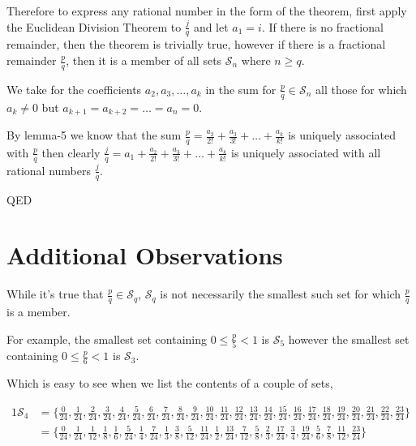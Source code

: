 \documentclass{article}
\begin{document}
Therefore to express any rational number in the form of the theorem, first apply the
Euclidean Division Theorem to \(\frac{j}{q}\) and let \(a_1 = i\). If there is no fractional remainder, then
the theorem is trivially true,
however if there is a fractional remainder \(\frac{p}{q}\), then it is a member of all sets \(\mathcal{S}_n\)
where \(n \ge{} q\).

We take for the coefficients \(a_2, a_3, \dots{}, a_k\) in the sum for \(\frac{p}{q} \in{} \mathcal{S}_n\)
all those for which \(a_k \ne{} 0\) but \(a_{k+1} = a_{k+2} = \dots{} = a_n = 0\).

By lemma-5 we know that the sum \(\frac{p}{q} = \frac{a_2}{2!} + \frac{a_3}{3!} + \dots{} + \frac{a_k}{k!}\) is
uniquely associated
with \(\frac{p}{q}\)
then clearly \(\frac{j}{q} = a_1 + \frac{a_2}{2!} + \frac{a_3}{3!} + \dots{} + \frac{a_k}{k!}\)
is uniquely associated with all rational numbers \(\frac{j}{q}\).

QED

\section*{Additional Observations}

While it's true that \(\frac{p}{q} \in{} \mathcal{S}_q\), \(\mathcal{S}_q\) is not necessarily 
the smallest such set for which \(\frac{p}{q}\) is a member.

For example,
the smallest set containing \(0 \le{} \frac{p}{5} < 1\) is \(\mathcal{S}_5\)
however
the smallest set containing \(0 \le{} \frac{p}{6} < 1\) is \(\mathcal{S}_3\).

Which is easy to see when we list the contents of a couple of sets,

{\footnotesize
\bgroup                                  %
\setlength{\abovedisplayskip}{0pt}
\begin{alignat*}{1}
\mathcal{S}_4 &= \{
\frac{ 0}{24},
\frac{ 1}{24},
\frac{ 2}{24},
\frac{ 3}{24},
\frac{ 4}{24},
\frac{ 5}{24},
\frac{ 6}{24},
\frac{ 7}{24},
\frac{ 8}{24},
\frac{ 9}{24},
\frac{10}{24},
\frac{11}{24},
\frac{12}{24},
\frac{13}{24},
\frac{14}{24},
\frac{15}{24},
\frac{16}{24},
\frac{17}{24},
\frac{18}{24},
\frac{19}{24},
\frac{20}{24},
\frac{21}{24},
\frac{22}{24},
\frac{23}{24}
\} \\
&= \{
\frac{ 0}{24},
\frac{ 1}{24},
\frac{ 1}{12},
\frac{ 1}{ 8},
\frac{ 1}{ 6},
\frac{ 5}{24},
\frac{ 1}{ 4},
\frac{ 7}{24},
\frac{ 1}{ 3},
\frac{ 3}{ 8},
\frac{ 5}{12},
\frac{11}{24},
\frac{ 1}{ 2},
\frac{13}{24},
\frac{ 7}{12},
\frac{ 5}{ 8},
\frac{ 2}{ 3},
\frac{17}{24},
\frac{ 3}{ 4},
\frac{19}{24},
\frac{ 5}{ 6},
\frac{ 7}{ 8},
\frac{11}{12},
\frac{23}{24}
\}
\end{alignat*}
\egroup
}
\end{document}
